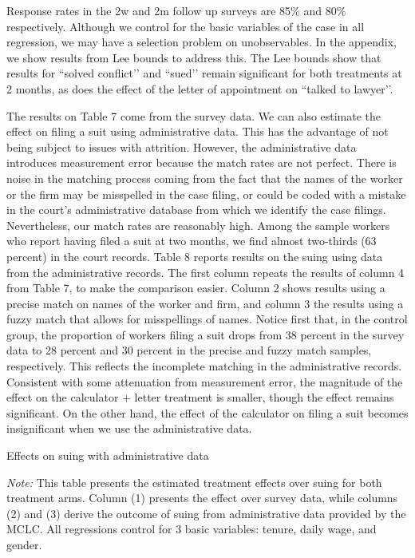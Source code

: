\documentclass[12 pt]{article}
\newenvironment{figurenotes}[1][\footnotesize{Note}]{\begin{minipage}[t]{\linewidth}\footnotesize{\itshape#1: }}{\end{minipage}}
\begin{document}
Response rates in the 2w and 2m follow up surveys are 85\% and 80\% respectively. Although we control for the basic variables of the case in all regression, we may have a selection problem on unobservables. In the appendix, we show results from Lee bounds to address this. The Lee bounds show that results for “solved conflict’’ and “sued’’ remain significant for both treatments at 2 months, as does the effect of the letter of appointment on “talked to lawyer’’.

The results on Table 7 come from the survey data. We can also estimate the effect on filing a suit using administrative data. This has the advantage of not being subject to issues with attrition. However, the administrative data introduces measurement error because the match rates are not perfect. There is noise in the matching process coming from the fact that the names of the worker or the firm may be misspelled in the case filing, or could be coded with a mistake in the court’s administrative database from which we identify the case filings. Nevertheless, our match rates are reasonably high. Among the sample workers who report having filed a suit at two months, we find almost two-thirds (63 percent) in the court records. Table 8 reports results on the suing using data from the administrative records. The first column repeats the results of column 4 from Table 7, to make the comparison easier. Column 2 shows results using a precise match on names of the worker and firm, and column 3 the results using a fuzzy match that allows for misspellings of names. Notice first that, in the control group, the proportion of workers filing a suit drops from 38 percent in the survey data to 28 percent and 30 percent in the precise and fuzzy match samples, respectively. This reflects the incomplete matching in the administrative records. Consistent with some attenuation from measurement error, the magnitude of the effect on the calculator + letter treatment is smaller, though the effect remains significant. On the other hand, the effect of the calculator on filing a suit becomes insignificant when we use the administrative data. 

\begin{table}[!ht]
    \caption{Effects on suing with administrative data} 
    \label{tab:8}
    \center
    \notesize{}
    \begin{figurenotes}
    This table presents the estimated treatment effects over suing for both treatment arms. Column (1) presents the effect over survey data, while columns (2) and (3) derive the outcome of suing from administrative data provided by the MCLC. All regressions control for 3 basic variables: tenure, daily wage, and gender. 
    \end{figurenotes}
  
\end{table}
\end{document}
